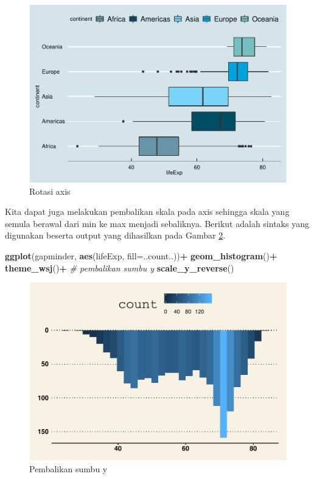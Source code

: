\documentclass[]{book}
\newenvironment{Shaded}{\begin{snugshade}}{\end{snugshade}}
\newcommand{\KeywordTok}[1]{\textcolor[rgb]{0.13,0.29,0.53}{\textbf{#1}}}
\newcommand{\DataTypeTok}[1]{\textcolor[rgb]{0.13,0.29,0.53}{#1}}
\newcommand{\StringTok}[1]{\textcolor[rgb]{0.31,0.60,0.02}{#1}}
\newcommand{\CommentTok}[1]{\textcolor[rgb]{0.56,0.35,0.01}{\textit{#1}}}
\newcommand{\OperatorTok}[1]{\textcolor[rgb]{0.81,0.36,0.00}{\textbf{#1}}}
\newcommand{\NormalTok}[1]{#1}
\begin{document}
\begin{figure}

{\centering \includegraphics[width=0.7\linewidth]{EnvStat_files/figure-latex/ggcoord-1} 

}

\caption{Rotasi axis}\label{fig:ggcoord}
\end{figure}

Kita dapat juga melakukan pembalikan skala pada axis sehingga skala yang
semula berawal dari min ke max menjadi sebaliknya. Berikut adalah
sintaks yang digunakan beserta output yang dihasilkan pada Gambar
\ref{fig:ggyreverse}.

\begin{Shaded}
\begin{Highlighting}[]
\KeywordTok{ggplot}\NormalTok{(gapminder, }\KeywordTok{aes}\NormalTok{(lifeExp, }\DataTypeTok{fill=}\NormalTok{..count..))}\OperatorTok{+}
\StringTok{  }\KeywordTok{geom_histogram}\NormalTok{()}\OperatorTok{+}
\StringTok{  }\KeywordTok{theme_wsj}\NormalTok{()}\OperatorTok{+}
\StringTok{  }\CommentTok{# pembalikan sumbu y}
\StringTok{  }\KeywordTok{scale_y_reverse}\NormalTok{()}
\end{Highlighting}
\end{Shaded}

\begin{figure}

{\centering \includegraphics[width=0.7\linewidth]{EnvStat_files/figure-latex/ggyreverse-1} 

}

\caption{Pembalikan sumbu y}\label{fig:ggyreverse}
\end{figure}
\end{document}

